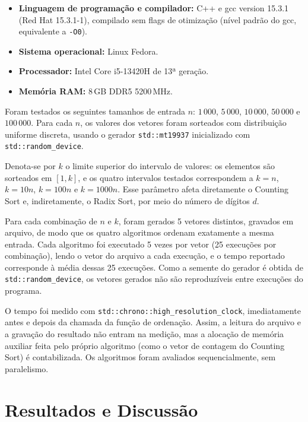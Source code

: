 \documentclass[12pt]{article}
\begin{document}
\begin{itemize}
  \item \textbf{Linguagem de programação e compilador:} C++ e gcc
    version 15.3.1 (Red Hat 15.3.1-1), compilado sem flags de otimização
    (nível padrão do gcc, equivalente a \texttt{-O0}).
  \item \textbf{Sistema operacional:} Linux Fedora.
  \item \textbf{Processador:} Intel Core i5-13420H de 13ª geração.
  \item \textbf{Memória RAM:} 8\,GB DDR5 5200\,MHz.
\end{itemize}

Foram testados os seguintes tamanhos de entrada $n$: $1\,000$, $5\,000$,
$10\,000$, $50\,000$ e $100\,000$. Para cada $n$, os valores dos vetores foram
sorteados com distribuição uniforme discreta, usando o gerador
\texttt{std::mt19937} inicializado com \texttt{std::random\_device}.

Denota-se por $k$ o limite superior do intervalo de valores: os elementos são
sorteados em $[1, k]$, e os quatro intervalos testados correspondem a
$k = n$, $k = 10n$, $k = 100n$ e $k = 1000n$. Esse parâmetro afeta
diretamente o Counting Sort e, indiretamente, o Radix Sort, por meio do
número de dígitos $d$.

Para cada combinação de $n$ e $k$, foram gerados 5 vetores distintos, gravados
em arquivo, de modo que os quatro algoritmos ordenam exatamente a mesma
entrada. Cada algoritmo foi executado 5 vezes por vetor (25 execuções por
combinação), lendo o vetor do arquivo a cada execução, e o tempo reportado
corresponde à média dessas 25 execuções. Como a semente do gerador é obtida
de \texttt{std::random\_device}, os vetores gerados não são reproduzíveis entre
execuções do programa.

O tempo foi medido com \texttt{std::chrono::high\_resolution\_clock}, imediatamente
antes e depois da chamada da função de ordenação. Assim, a leitura do arquivo
e a gravação do resultado não entram na medição, mas a alocação de memória
auxiliar feita pelo próprio algoritmo (como o vetor de contagem do Counting
Sort) é contabilizada. Os algoritmos foram avaliados sequencialmente, sem
paralelismo.

\section{Resultados e Discussão}
\label{sec:resultados}
\end{document}
